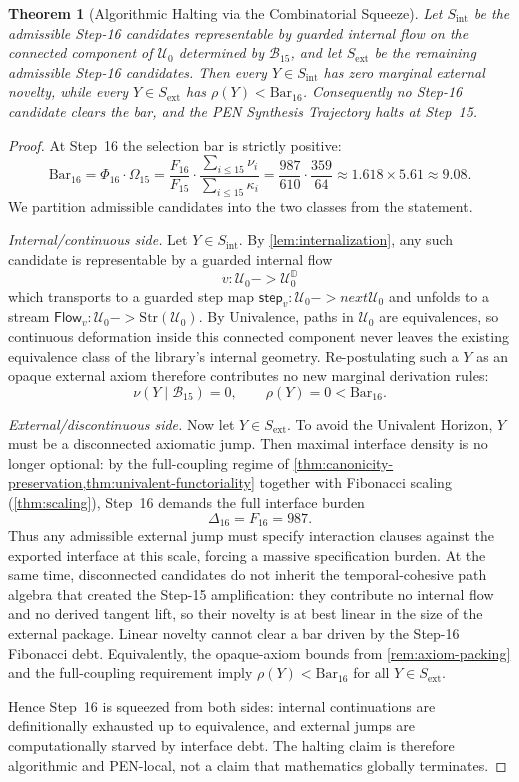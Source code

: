 \documentclass[11pt,a4paper]{article}
\def\to{->}%
\def\bigcirc{next}%
\theoremstyle{plain}
\newtheorem{theorem}{Theorem}[section]
\theoremstyle{definition}
\theoremstyle{remark}
\newcommand{\D}{\mathbb{D}}
\newcommand{\U}{\mathcal{U}}
\begin{document}
\begin{theorem}[Algorithmic Halting via the Combinatorial Squeeze]
\label{thm:end-of-history}
Let $S_{\mathrm{int}}$ be the admissible Step-16 candidates representable by guarded internal flow on the connected component of $\U_0$ determined by $\mathcal{B}_{15}$, and let $S_{\mathrm{ext}}$ be the remaining admissible Step-16 candidates.  Then every $Y \in S_{\mathrm{int}}$ has zero marginal external novelty, while every $Y \in S_{\mathrm{ext}}$ has $\rho(Y) < \mathrm{Bar}_{16}$.  Consequently no Step-16 candidate clears the bar, and the PEN Synthesis Trajectory halts at Step~15.
\end{theorem}
\begin{proof}
At Step~16 the selection bar is strictly positive:
\[
  \mathrm{Bar}_{16} = \Phi_{16} \cdot \Omega_{15}
  = \frac{F_{16}}{F_{15}} \cdot \frac{\sum_{i \le 15}\nu_i}{\sum_{i \le 15}\kappa_i}
  = \frac{987}{610} \cdot \frac{359}{64} \approx 1.618 \times 5.61 \approx 9.08 .
\]
We partition admissible candidates into the two classes from the statement.

\emph{Internal/continuous side.}
Let $Y \in S_{\mathrm{int}}$.  By \cref{lem:internalization}, any such candidate is representable by a guarded internal flow
\[
  v : \U_0 \to \U_0^\D
\]
which transports to a guarded step map $\mathsf{step}_v : \U_0 \to \bigcirc \U_0$ and unfolds to a stream $\mathsf{Flow}_v : \U_0 \to \mathrm{Str}(\U_0)$.
By Univalence, paths in $\U_0$ are equivalences, so continuous deformation inside this connected component never leaves the existing equivalence class of the library's internal geometry.
Re-postulating such a $Y$ as an opaque external axiom therefore contributes no new marginal derivation rules:
\[
  \nu(Y \mid \mathcal{B}_{15}) = 0,
\qquad
  \rho(Y) = 0 < \mathrm{Bar}_{16}.
\]

\emph{External/discontinuous side.}
Now let $Y \in S_{\mathrm{ext}}$.
To avoid the Univalent Horizon, $Y$ must be a disconnected axiomatic jump.
Then maximal interface density is no longer optional: by the full-coupling regime of \cref{thm:canonicity-preservation,thm:univalent-functoriality} together with Fibonacci scaling (\cref{thm:scaling}), Step~16 demands the full interface burden
\[
  \Delta_{16} = F_{16} = 987 .
\]
Thus any admissible external jump must specify interaction clauses against the exported interface at this scale, forcing a massive specification burden.
At the same time, disconnected candidates do not inherit the temporal-cohesive path algebra that created the Step-15 amplification: they contribute no internal flow and no derived tangent lift, so their novelty is at best linear in the size of the external package.
Linear novelty cannot clear a bar driven by the Step-16 Fibonacci debt.
Equivalently, the opaque-axiom bounds from \cref{rem:axiom-packing} and the full-coupling requirement imply $\rho(Y) < \mathrm{Bar}_{16}$ for all $Y \in S_{\mathrm{ext}}$.

Hence Step~16 is squeezed from both sides: internal continuations are definitionally exhausted up to equivalence, and external jumps are computationally starved by interface debt.
The halting claim is therefore algorithmic and PEN-local, not a claim that mathematics globally terminates.
\end{proof}
\end{document}

